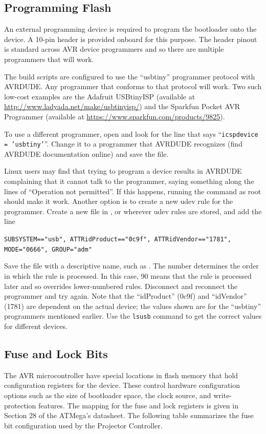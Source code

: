 \documentclass{article}
\begin{document}
\subsection{Programming Flash} \label{ssec:FWProgFlash}
An external programming device is required to program the bootloader onto the device.  A 10-pin
header is provided onboard for this purpose.  The header pinout is standard across AVR device
programmers and so there are multiple programmers that will work.  

The build scripts are configured to use the ``usbtiny'' programmer protocol with AVRDUDE.  Any
programmer that conforms to that protocol will work.  Two such low-cost examples are the Adafruit
USBtinyISP (available at \url{http://www.ladyada.net/make/usbtinyisp/}) and the Sparkfun Pocket AVR
Programmer (available at \url{https://www.sparkfun.com/products/9825}).

To use a different programmer, open  and look for the line
that says ``\texttt{icspdevice = 'usbtiny'}''.  Change it to a programmer that AVRDUDE recognizes (find
AVRDUDE documentation online) and save the file.

Linux users may find that trying to program a device results in AVRDUDE complaining that it cannot
talk to the programmer, saying something along the lines of ``Operation not permitted''.  If this
happens, running the command as root should make it work.  Another option is to create a new udev
rule for the programmer.  Create a new file in , or wherever udev rules
are stored, and add the line

\texttt{SUBSYSTEM=="usb", ATTR{idProduct}=="0c9f", ATTR{idVendor}=="1781", MODE="0666", GROUP="adm"}

Save the file with a descriptive name, such as .  The number determines the
order in which the rule is processed.  In this case, 90 means that the rule is processed later and
so overrides lower-numbered rules.  Disconnect and reconnect the programmer and try again.  Note
that the ``idProduct'' (0c9f) and ``idVendor'' (1781) are dependent on the actual device; the values
shown are for the ``usbtiny'' programmers mentioned earlier.  Use the \texttt{lsusb} command to get
the correct values for different devices.

\subsection{Fuse and Lock Bits} \label{ssec:FWFuseBits}
The AVR microcontroller have special locations in flash memory that hold configuration registers for
the device.  These control hardware configuration options such as the size of bootloader space, the
clock source, and write-protection features.  The mapping for the fuse and lock registers is given
in Section 28 of the ATMega's datasheet.  The following table summarizes the fuse bit configuration
used by the Projector Controller.
\end{document}
